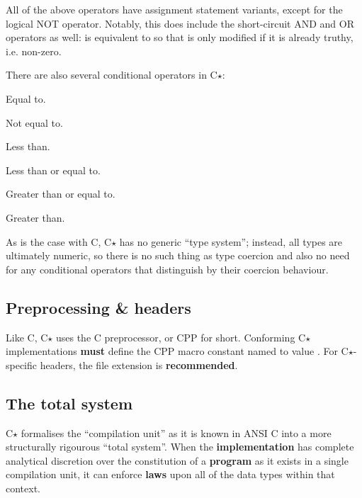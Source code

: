 \documentclass[12pt,english]{article}
\renewcommand{\texttt}[1]{\ttfamily{\small{#1}}\normalfont{}}
\begin{document}
All of the above operators have assignment statement variants, except for the
logical NOT operator. Notably, this does include the short-circuit AND and OR
operators as well: \texttt{x \&\&= y;} is equivalent to \texttt{x = x \&\& y;}
so that \texttt{x} is only modified if it is already truthy, i.e. non-zero.

There are also several conditional operators in C$\star$:

\begin{labeling}{\textbf{\texttt{===}}}
\item [\textbf{\texttt{==}}] Equal to.
\item [\textbf{\texttt{!=}}] Not equal to.
\item [\textbf{\texttt{<}}] Less than.
\item [\textbf{\texttt{<=}}] Less than or equal to.
\item [\textbf{\texttt{>=}}] Greater than or equal to.
\item [\textbf{\texttt{>}}] Greater than.
\end{labeling}

As is the case with C, C$\star$ has no generic ``type system''; instead, all
types are ultimately numeric, so there is no such thing as type coercion and
also no need for any conditional operators that distinguish by their coercion
behaviour.

\subsection{Preprocessing \& headers}
\label{s-language-preprocessing_headers}

Like C, C$\star$ uses the C preprocessor, or CPP for short. Conforming
C$\star$ implementations \textbf{must} define the CPP macro constant named
\texttt{\_\_cstar} to value \texttt{1}. For C$\star$-specific headers, the file
extension \texttt{.hst} is \textbf{recommended}.

\subsection{The total system}
\label{s-language-total_system}

C$\star$ formalises the ``compilation unit'' as it is known in ANSI C into a
more structurally rigourous ``total system''. When the \textbf{implementation}
has complete analytical discretion over the constitution of a \textbf{program}
as it exists in a single compilation unit, it can enforce \textbf{laws} upon
all of the data types within that context.
\end{document}
